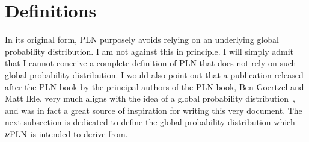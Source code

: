 \documentclass[]{article}
\begin{document}
\section{Definitions}
In its original form, PLN purposely avoids relying on an underlying
global probability distribution.  I am not against this in principle.
I will simply admit that I cannot conceive a complete definition of
PLN that does not rely on such global probability distribution.  I
would also point out that a publication released after the PLN book by
the principal authors of the PLN book, Ben Goertzel and Matt Ikle,
very much aligns with the idea of a global probability
distribution~\cite{TODO}, and was in fact a great source of
inspiration for writing this very document.  The next subsection is
dedicated to define the global probability distribution which $\nu\textup{PLN}$
is intended to derive from.
\end{document}
